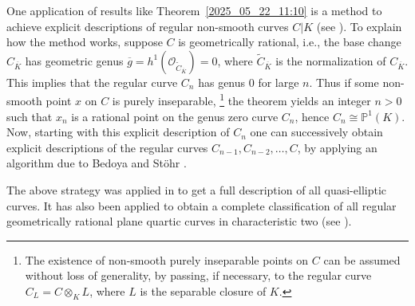 \documentclass[12pt,reqno]{amsart}%
\theoremstyle{definition}
\theoremstyle{remark}
\newcommand{\ov}{\overline}
\newcommand{\isom}{\cong}%
\newcommand{\PP}{\mathbb{P}}
\newcommand{\OO}{\mathcal{O}}
\newcommand{\de}{\delta}
\newcommand{\lam}{\lambda}
\begin{document}


One application of results like Theorem~\ref{2025_05_22_11:10} is a method to achieve explicit descriptions of regular non-smooth curves $C|K$  (see \cite[p.\,281]{HiSt22}). 
To explain how the method works, suppose $C$ is geometrically rational, i.e., the base change $C_{\ov K}$ has geometric genus $\ov g = h^1(\OO_{\tilde C_{\ov K}}) = 0$, where $\tilde C_{\ov K}$ is the normalization of $C_{\ov K}$. This implies that the regular curve $C_n$ has genus $0$ for large $n$. 
Thus if some non-smooth point $x$ on $C$ is purely inseparable,
\footnote{The existence of non-smooth purely inseparable points on $C$ can be assumed without loss of generality, by passing, if necessary, to the regular curve $C_L = C \otimes_K L$, where $L$ is the separable closure of $K$.}
the theorem yields an integer $n>0$ such that $x_n$ is a rational point on the genus zero curve $C_n$, hence $C_n \isom \PP^1(K)$. 
Now, starting with this explicit description of $C_n$ one can successively obtain explicit descriptions of the regular curves $C_{n-1},C_{n-2},\dots,C$, by applying an algorithm due to Bedoya and St\"ohr \cite{BedSt87}.

The above strategy was applied in \cite[Section~2]{HiSt23} to get a full description of all quasi-elliptic curves.
It has also been applied to obtain a complete classification of all regular geometrically rational plane quartic curves in characteristic two (see \cite{HiSt24}).
\end{document}
